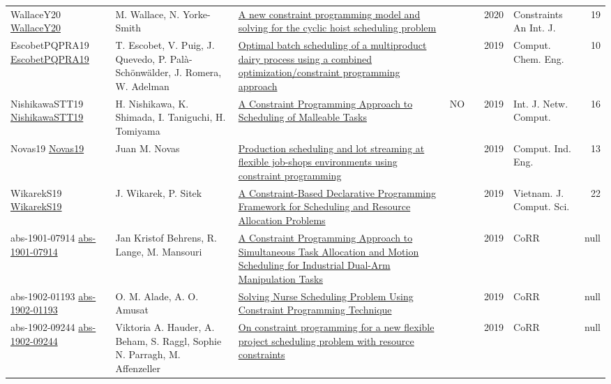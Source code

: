 {\begin{longtable}{p{3cm}p{6cm}p{7cm}rrrp{3cm}r}
WallaceY20 \href{https://doi.org/10.1007/s10601-020-09316-z}{WallaceY20} & M. Wallace, N. Yorke{-}Smith & \href{articles/WallaceY20.pdf}{A new constraint programming model and solving for the cyclic hoist scheduling problem} &  & \cite{WallaceY20} & 2020 & Constraints An Int. J. & 19\\
EscobetPQPRA19 \href{https://doi.org/10.1016/j.compchemeng.2018.08.040}{EscobetPQPRA19} & T. Escobet, V. Puig, J. Quevedo, P. Pal{\`{a}}{-}Sch{\"{o}}nw{\"{a}}lder, J. Romera, W. Adelman & \href{articles/EscobetPQPRA19.pdf}{Optimal batch scheduling of a multiproduct dairy process using a combined optimization/constraint programming approach} &  & \cite{EscobetPQPRA19} & 2019 & Comput. Chem. Eng. & 10\\
NishikawaSTT19 \href{http://www.ijnc.org/index.php/ijnc/article/view/201}{NishikawaSTT19} & H. Nishikawa, K. Shimada, I. Taniguchi, H. Tomiyama & \href{articles/NishikawaSTT19.pdf}{A Constraint Programming Approach to Scheduling of Malleable Tasks} & NO & \cite{NishikawaSTT19} & 2019 & Int. J. Netw. Comput. & 16\\
Novas19 \href{https://doi.org/10.1016/j.cie.2019.07.011}{Novas19} & Juan M. Novas & \href{articles/Novas19.pdf}{Production scheduling and lot streaming at flexible job-shops environments using constraint programming} &  & \cite{Novas19} & 2019 & Comput. Ind. Eng. & 13\\
WikarekS19 \href{https://doi.org/10.1142/S2196888819500027}{WikarekS19} & J. Wikarek, P. Sitek & \href{articles/WikarekS19.pdf}{A Constraint-Based Declarative Programming Framework for Scheduling and Resource Allocation Problems} &  & \cite{WikarekS19} & 2019 & Vietnam. J. Comput. Sci. & 22\\
abs-1901-07914 \href{http://arxiv.org/abs/1901.07914}{abs-1901-07914} & Jan Kristof Behrens, R. Lange, M. Mansouri & \href{articles/abs-1901-07914.pdf}{A Constraint Programming Approach to Simultaneous Task Allocation and Motion Scheduling for Industrial Dual-Arm Manipulation Tasks} &  & \cite{abs-1901-07914} & 2019 & CoRR & null\\
abs-1902-01193 \href{http://arxiv.org/abs/1902.01193}{abs-1902-01193} & O. M. Alade, A. O. Amusat & \href{articles/abs-1902-01193.pdf}{Solving Nurse Scheduling Problem Using Constraint Programming Technique} &  & \cite{abs-1902-01193} & 2019 & CoRR & null\\
abs-1902-09244 \href{http://arxiv.org/abs/1902.09244}{abs-1902-09244} & Viktoria A. Hauder, A. Beham, S. Raggl, Sophie N. Parragh, M. Affenzeller & \href{articles/abs-1902-09244.pdf}{On constraint programming for a new flexible project scheduling problem with resource constraints} &  & \cite{abs-1902-09244} & 2019 & CoRR & null\\

\end{longtable}}
